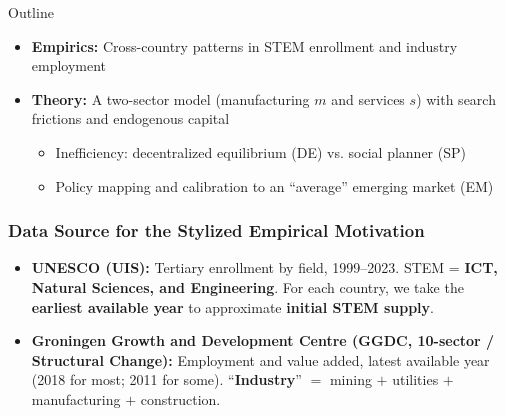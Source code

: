 \documentclass[9pt,xcolor={svgnames}]{beamer}
\begin{document}
\begin{frame}{Outline}
\begin{itemize}
    \item \textbf{Empirics:}  
    Cross-country patterns in STEM enrollment and industry employment

    \medskip

    \item \textbf{Theory:}  
    A two-sector model (manufacturing $m$ and services $s$) 
    with search frictions and endogenous capital

    \medskip

    \begin{itemize}
        \item Inefficiency: decentralized equilibrium (DE) vs. social planner (SP)
        \vspace{2mm}
        \item Policy mapping and calibration to an “average” emerging market (EM)
    \end{itemize}
\end{itemize}
\end{frame}


\begin{frame}
\frametitle{Data Source for the Stylized Empirical Motivation}
\begin{itemize}

\item \textbf{UNESCO (UIS):} Tertiary enrollment by field, 1999–2023. 
STEM = \textbf{ICT, Natural Sciences, and Engineering}.  
For each country, we take the \textbf{earliest available year} to approximate \textbf{initial STEM supply}.

\medskip

\item \textbf{Groningen Growth and Development Centre (GGDC, 10-sector / Structural Change):} 
Employment and value added, latest available year (2018 for most; 2011 for some).  
“\textbf{Industry}” $=$ mining $+$ utilities $+$ manufacturing $+$ construction.

\end{itemize}
\end{frame}
\end{document}
